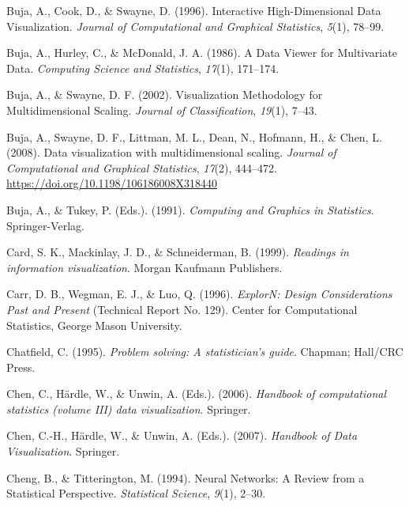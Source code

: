 \documentclass[
  letterpaper,
]{krantz}
\newlength{\cslhangindent}
\newlength{\cslentryspacingunit} %
\newenvironment{CSLReferences}[2] %
 {%
  \setlength{\parindent}{0pt}
  \ifodd #1
  \let\oldpar\par
  \def\par{\hangindent=\cslhangindent\oldpar}
  \fi
  \setlength{\parskip}{#2\cslentryspacingunit}
 }%
 {}
\begin{document}
\begin{CSLReferences}{1}{0}
\leavevmode{}%
Buja, A., Cook, D., \& Swayne, D. (1996). {I}nteractive
{H}igh-{D}imensional {D}ata {V}isualization. \emph{Journal of
Computational and Graphical Statistics}, \emph{5}(1), 78--99.

\leavevmode{}%
Buja, A., Hurley, C., \& McDonald, J. A. (1986). A {D}ata {V}iewer for
{M}ultivariate {D}ata. \emph{Computing Science and Statistics},
\emph{17}(1), 171--174.

\leavevmode{}%
Buja, A., \& Swayne, D. F. (2002). Visualization {M}ethodology for
{M}ultidimensional {S}caling. \emph{Journal of Classification},
\emph{19}(1), 7--43.

\leavevmode{}%
Buja, A., Swayne, D. F., Littman, M. L., Dean, N., Hofmann, H., \& Chen,
L. (2008). Data visualization with multidimensional scaling.
\emph{Journal of Computational and Graphical Statistics}, \emph{17}(2),
444--472. \url{https://doi.org/10.1198/106186008X318440}

\leavevmode{}%
Buja, A., \& Tukey, P. (Eds.). (1991). \emph{Computing and {G}raphics in
{S}tatistics}. Springer-Verlag.

\leavevmode{}%
Card, S. K., Mackinlay, J. D., \& Schneiderman, B. (1999).
\emph{Readings in information visualization}. Morgan Kaufmann
Publishers.

\leavevmode{}%
Carr, D. B., Wegman, E. J., \& Luo, Q. (1996). \emph{Explor{N}: {D}esign
{C}onsiderations {P}ast and {P}resent} (Technical Report No. 129).
Center for Computational Statistics, George Mason University.

\leavevmode{}%
Chatfield, C. (1995). \emph{Problem solving: A statistician's guide}.
Chapman; Hall/CRC Press.

\leavevmode{}%
Chen, C., Härdle, W., \& Unwin, A. (Eds.). (2006). \emph{Handbook of
computational statistics (volume III) data visualization}. Springer.

\leavevmode{}%
Chen, C.-H., Härdle, W., \& Unwin, A. (Eds.). (2007). \emph{Handbook of
{D}ata {V}isualization}. Springer.

\leavevmode{}%
Cheng, B., \& Titterington, M. (1994). Neural {N}etworks: {A} {R}eview
from a {S}tatistical {P}erspective. \emph{Statistical Science},
\emph{9}(1), 2--30.


\end{CSLReferences}
\end{document}
